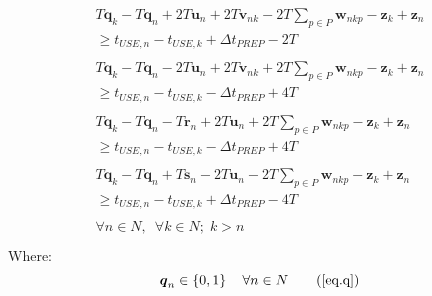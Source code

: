 \begin{equation}
    \begin{split}
        \begin{aligned}
            T \boldsymbol{q}_{k} - T \boldsymbol{q}_{n} + 2T \boldsymbol{u}_{n} 
            + 2T \boldsymbol{v}_{nk} - 2T \sum_{p \in P} \boldsymbol{w}_{nkp} 
            - \boldsymbol{z}_{k} + \boldsymbol{z}_{n}\\
            \ge t_{\mathit{USE},n} - t_{\mathit{USE},k}
            + \Delta t_{\mathit{PREP}} - 2T
        \end{aligned}\\
        \begin{aligned}
            T \boldsymbol{q}_{k} - T \boldsymbol{q}_{n} - 2T \boldsymbol{u}_{n} 
            + 2T \boldsymbol{v}_{nk} + 2T \sum_{p \in P} \boldsymbol{w}_{nkp} 
            - \boldsymbol{z}_{k} + \boldsymbol{z}_{n}\\
            \ge t_{\mathit{USE},n} - t_{\mathit{USE},k}
            - \Delta t_{\mathit{PREP}} + 4T
        \end{aligned}\\
        \begin{aligned}
            T \boldsymbol{q}_{k} - T \boldsymbol{q}_{n} - T \boldsymbol{r}_{n}
            + 2T \boldsymbol{u}_{n} + 2T \sum_{p \in P} \boldsymbol{w}_{nkp} 
            - \boldsymbol{z}_{k} + \boldsymbol{z}_{n}\\
            \ge t_{\mathit{USE},n} - t_{\mathit{USE},k}
            - \Delta t_{\mathit{PREP}} + 4T
        \end{aligned}\\
        \begin{aligned}
            T \boldsymbol{q}_{k} - T \boldsymbol{q}_{n} + T \boldsymbol{s}_{n}
            - 2T \boldsymbol{u}_{n} - 2T \sum_{p \in P} \boldsymbol{w}_{nkp} 
            - \boldsymbol{z}_{k} + \boldsymbol{z}_{n}\\
            \ge t_{\mathit{USE},n} - t_{\mathit{USE},k}
            + \Delta t_{\mathit{PREP}} - 4T
        \end{aligned}\\
        \begin{aligned}
            \forall n \in N, \enspace \forall k \in N; \; k > n
        \end{aligned}\\
    \end{split}
    \label{eq.k6}
\end{equation}
Where:
\begin{equation}
    \boldsymbol{q}_{n} \in \left\{0, 1\right\} \quad \forall n \in N
    \tag{\ref{eq.q}}
\end{equation}
